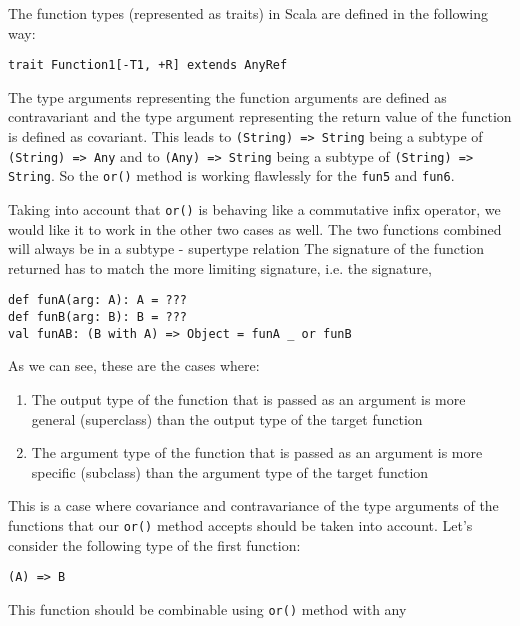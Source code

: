The function types (represented as traits) in Scala are defined in the following way:
\lstset{language=Scala}
\begin{lstlisting}
trait Function1[-T1, +R] extends AnyRef
\end{lstlisting}

The type arguments representing the function arguments are defined as contravariant and the type argument representing the return value of the function is defined as covariant. This leads to \lstinline|(String) => String| being a subtype of \lstinline|(String) => Any| and to \lstinline|(Any) => String| being a subtype of \lstinline|(String) => String|. So the \lstinline|or()| method is working flawlessly for the \lstinline|fun5| and \lstinline|fun6|.

Taking into account that \lstinline|or()| is behaving like a commutative infix operator, we would like it to work in the other two cases as well. The two functions combined will always be in a subtype - supertype relation The signature of the function returned has to match the more limiting signature, i.e. the signature,

\begin{lstlisting}
def funA(arg: A): A = ???
def funB(arg: B): B = ???
val funAB: (B with A) => Object = funA _ or funB
\end{lstlisting}


 As we can see, these are the cases where:

\begin{enumerate}
	\item The output type of the function that is passed as an argument is more general (superclass) than the output type of the target function
	\item The argument type of the function that is passed as an argument is more specific (subclass) than the argument type of the target function
\end{enumerate}

This is a case where covariance and contravariance of the type arguments of the functions that our \lstinline|or()| method accepts should be taken into account. Let's consider the following type of the first function:

\lstset{language=Scala}
\begin{lstlisting}
(A) => B
\end{lstlisting}

This function should be combinable using \lstinline|or()| method with any 

